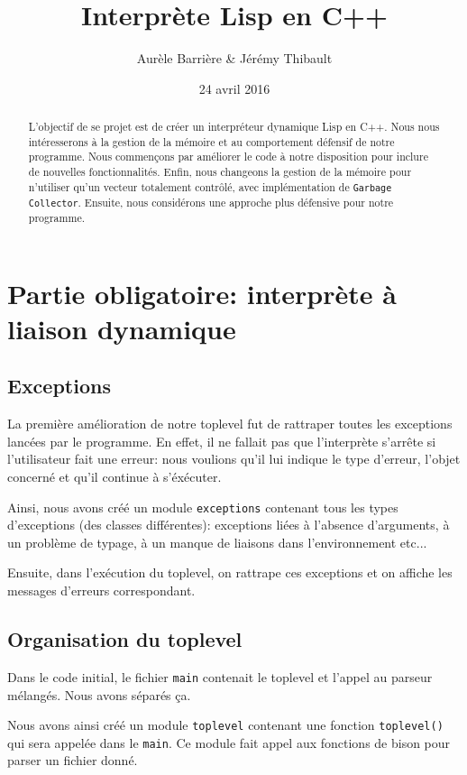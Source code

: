 \documentclass[12pt]{article}
\title{Interprète Lisp en C++}
\author{Aurèle Barrière \& Jérémy Thibault}
\date{24 avril 2016}
\def\code #1{\lstinline{#1}}
\begin{document}
\maketitle
\tableofcontents

\begin{abstract}
  L'objectif de se projet est de créer un interpréteur dynamique Lisp en C++. Nous nous intéresserons à la gestion de la mémoire et au comportement défensif de notre programme. Nous commençons par améliorer le code à notre disposition pour inclure de nouvelles fonctionnalités. Enfin, nous changeons la gestion de la mémoire pour n'utiliser qu'un vecteur totalement contrôlé, avec implémentation de \code{Garbage Collector}. Ensuite, nous considérons une approche plus défensive pour notre programme.
\end{abstract}
\newpage

\section{Partie obligatoire: interprète à liaison dynamique}

\subsection{Exceptions}
La première amélioration de notre toplevel fut de rattraper toutes les exceptions lancées par le programme. En effet, il ne fallait pas que l'interprète s'arrête si l'utilisateur fait une erreur: nous voulions qu'il lui indique le type d'erreur, l'objet concerné et qu'il continue à s'éxécuter.

Ainsi, nous avons créé un module \code{exceptions} contenant tous les types d'exceptions (des classes différentes): exceptions liées à l'absence d'arguments, à un problème de typage, à un manque de liaisons dans l'environnement etc...

Ensuite, dans l'exécution du toplevel, on rattrape ces exceptions et on affiche les messages d'erreurs correspondant.

\subsection{Organisation du toplevel}

Dans le code initial, le fichier \code{main} contenait le toplevel et l'appel au parseur mélangés. Nous avons séparés ça.

Nous avons ainsi créé un module \code{toplevel} contenant une fonction \code{toplevel()} qui sera appelée dans le \code{main}. Ce module fait appel aux fonctions de bison pour parser un fichier donné.
\end{document}
